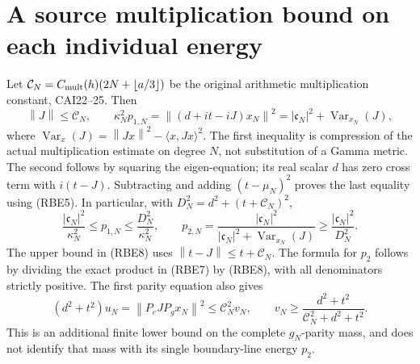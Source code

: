 \documentclass[11pt,a4paper]{article}
\providecommand{\norm}[1]{\left\lVert#1\right\rVert}
\begin{document}
\section{A source multiplication bound on each individual energy}

Let \(\mathcal C_N=C_{\rm mult}(h)(2N+\lfloor a/3\rfloor)\)
be the original arithmetic multiplication constant, CAI22--25.
Then
\begin{equation}\tag{RBE8}
 \norm{J}\le\mathcal C_N,\qquad
 \kappa_N^2p_{1,N}
   =\norm{(d+it-iJ)x_N}^2
   =|\mathfrak c_N|^2+\operatorname{Var}_{x_N}(J),
\end{equation}
where \(\operatorname{Var}_{x}(J)=\norm{Jx}^2-\langle x,Jx\rangle^2\).
The first inequality is compression of the actual multiplication
estimate on degree \(N\), not substitution of a Gamma metric.
The second follows by squaring the eigen-equation; its real scalar
\(d\) has zero cross term with \(i(t-J)\). Subtracting and adding
\((t-\mu_N)^2\) proves the last equality using (RBE5).
In particular, with
\(D_N^2=d^2+(t+\mathcal C_N)^2\),
\begin{equation}\tag{RBE9}
 \frac{|\mathfrak c_N|^2}{\kappa_N^2}
 \le p_{1,N}\le\frac{D_N^2}{\kappa_N^2},\qquad
 p_{2,N}=\frac{|\mathfrak c_N|^2}
 {|\mathfrak c_N|^2+\operatorname{Var}_{x_N}(J)}
 \ge\frac{|\mathfrak c_N|^2}{D_N^2}.
\end{equation}
The upper bound in (RBE8) uses \(\norm{t-J}\le t+\mathcal C_N\).
The formula for \(p_2\) follows by dividing the exact product
in (RBE7) by (RBE8), with all denominators strictly positive.
The first parity equation also gives
\begin{equation}\tag{RBE10}
 (d^2+t^2)u_N=\norm{P_eJP_gx_N}^2
   \le\mathcal C_N^2v_N,\qquad
 v_N\ge\frac{d^2+t^2}{\mathcal C_N^2+d^2+t^2}.
\end{equation}
This is an additional finite lower bound on the complete
\(g_N\)-parity mass, and does not identify that mass with its
single boundary-line energy \(p_2\).
\end{document}
